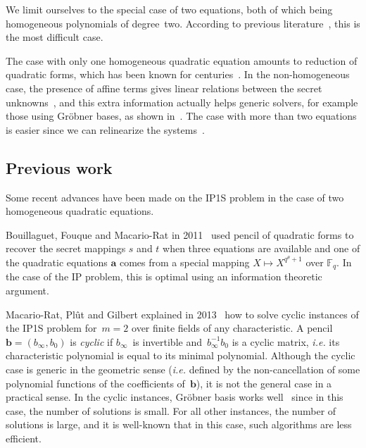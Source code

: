 \documentclass{lms}%
\def\F{\mathbb{F}}
\begin{document}
We limit ourselves to the special case of two equations, both of which
being homogeneous polynomials of degree~two. According to previous
literature~\cite{DBLP:conf/eurocrypt/Perret05,DBLP:conf/eurocrypt/FaugereP06,DBLP:conf/pkc/BouillaguetFFP11,DBLP:conf/eurocrypt/BouillaguetFV13},
this is the most difficult case.

The case with only one homogeneous quadratic equation amounts to
reduction of quadratic forms, which has been known for
centuries~\cite{gauss,lidl1997finite}. In the non-homogeneous case, the
presence of affine terms gives linear relations between the secret
unknowns~\cite{DBLP:conf/eurocrypt/PatarinGC98}, and this extra
information actually helps generic solvers, for example those using
Gröbner bases, as shown in~\cite{DBLP:conf/eurocrypt/FaugereP06}.
The case with more than two equations is easier since we can relinearize
the systems~\cite{DBLP:conf/pkc/BouillaguetFFP11}.

\subsection*{Previous work}%

Some recent advances have been made on the IP1S problem in the case of
two
homogeneous quadratic equations.


Bouillaguet, Fouque and Macario-Rat in 2011~\cite{DBLP:conf/asiacrypt/BouillaguetFM11} 
used pencil of quadratic forms to recover the secret mappings $s$ and $t$
when three equations are available
and one of the quadratic equations $\bm{a}$ comes from a special mapping $X\mapsto X^{q^\theta+1}$ 
over $\F_q$. In the case of the IP problem, this is optimal using an information theoretic argument.

Macario-Rat, Plût and Gilbert explained in 2013~\cite{MPG2013} how to
solve cyclic instances of the IP1S problem for~$m=2$ over finite fields
of any characteristic. A pencil~$\bm{b} = (b_{∞}, b_0)$ is \emph{cyclic}
if $b_{∞}$~is invertible and~$b_{∞}^{-1} b_{0}$ is a cyclic matrix,
\emph{i.e.} its characteristic polynomial is equal to its minimal
polynomial. Although the cyclic case is generic in the geometric sense
(\emph{i.e.} defined by the non-cancellation of some polynomial functions
of the coefficients of~$\bm{b}$), it is not the general case in a
practical sense. In the cyclic instances, Gröbner basis works
well~\cite{DBLP:conf/pkc/BouillaguetFFP11} since in this case, the number
of solutions is small. For all other instances, the number of solutions
is large, and it is well-known that in this case, such algorithms are
less efficient.
\end{document}
